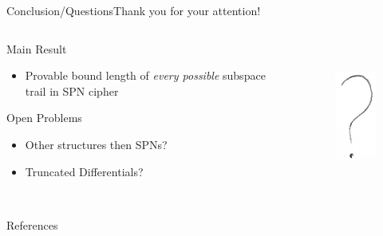 \begin{frame}{Conclusion/Questions}{Thank you for your attention!}
    \begin{columns}
        \begin{column}{0.5\textwidth}
            \begin{block}{Main Result}
                \begin{itemize}
                    \item Provable bound length of \emph{every possible} subspace trail in SPN cipher
                \end{itemize}
            \end{block}
            \begin{block}{Open Problems}
                \begin{itemize}
                    \item Other structures then SPNs?
                    \item Truncated Differentials?
                \end{itemize}
            \end{block}
        \end{column}
        \begin{column}{0.39\textwidth}
        \begin{figure}[!htb]
            \includegraphics[height=50mm]{data/flickr/questionmark.png}
        \end{figure}
        \end{column}
    \end{columns}
\end{frame}

\begin{frame}[allowframebreaks]{References}
    \tiny
    \printbibliography{}
\end{frame}
